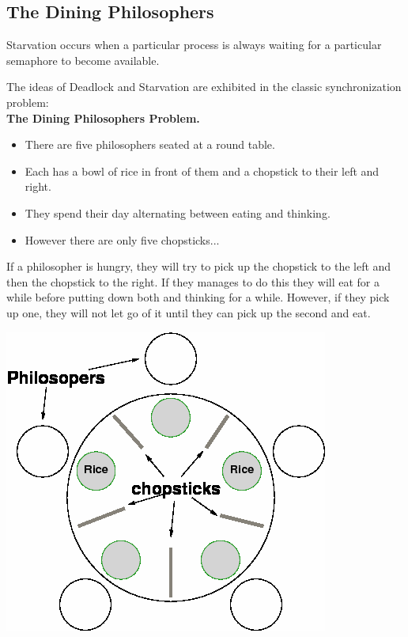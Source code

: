 \documentclass[a4paper, 10pt]{article}
\begin{document}
\subsection{The Dining Philosophers}
\begin{definitionbox}{}{}
    Starvation occurs when a particular process is always waiting for a particular semaphore to become available.
\end{definitionbox}
\noindent The ideas of Deadlock and Starvation are exhibited in the classic synchronization problem: \\[2ex]
\textbf{The Dining Philosophers Problem.}
\begin{itemize}
    \item There are five philosophers seated at a round table.
    \item Each has a bowl of rice in front of them and a chopstick to their left and right.
    \item They spend their day alternating between eating and thinking.
    \item However there are only five chopsticks...
\end{itemize}
\begin{minipage}{0.6\textwidth}
    If a philosopher is hungry, they will try to pick up the chopstick to the left and then the chopstick to the right. If they manages to do this they will eat for a while before putting down both and thinking for a while. However, if they pick up one, they will not let go of it until they can pick up the second and eat.
\end{minipage}
\begin{minipage}{0.39\textwidth}
    \begin{center}
        \includegraphics[scale=0.3]{images/diningPhilosophers.png}
    \end{center}
\end{minipage} \\[2ex]
\end{document}
